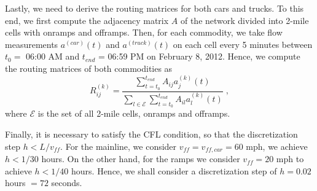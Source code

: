 \documentclass[preprint,12pt]{elsarticle}
\newcommand{\mc}{\mathcal}
\begin{document}
        Lastly, we need to derive the routing matrices for both cars and trucks. To this end, we first compute the adjacency matrix $A$ of the network divided into 2-mile cells with onramps and offramps. Then, for each commodity, we take flow measurements $a^{(car)}(t)$ and $a^{(truck)}(t)$ on each cell every 5 minutes between $t_0 =$ 06:00 AM and $t_{end}$ = 06:59 PM on February 8, 2012. Hence, we compute the routing matrices of both commodities as
        $$
        R^{(k)}_{ij} = \frac{\sum\limits_{t = t_0}^{t_{end}}A_{ij}a^{(k)}_j(t)} {\sum\limits_{l \in \mc{E}} {\sum\limits_{t = t_0}^{t_{end}}A_{il}a^{(k)}_l(t)}}\;,
        $$
        where $\mc{E}$ is the set of all 2-mile cells, onramps and offramps.
		
         Finally, it is necessary to satisfy the CFL condition, so that the discretization step $h < {L}/{v_{ff}}$. For the mainline, we consider $v_{ff} = v_{ff,car} = 60$ mph, we achieve $h < {1}/{30}$ hours. On the other hand, for the ramps we consider $v_{ff} = 20$ mph to achieve $h < {1}/{40}$ hours. Hence, we shall consider a discretization step of $h = 0.02$ hours $= 72$ seconds.
		
		
\end{document}
